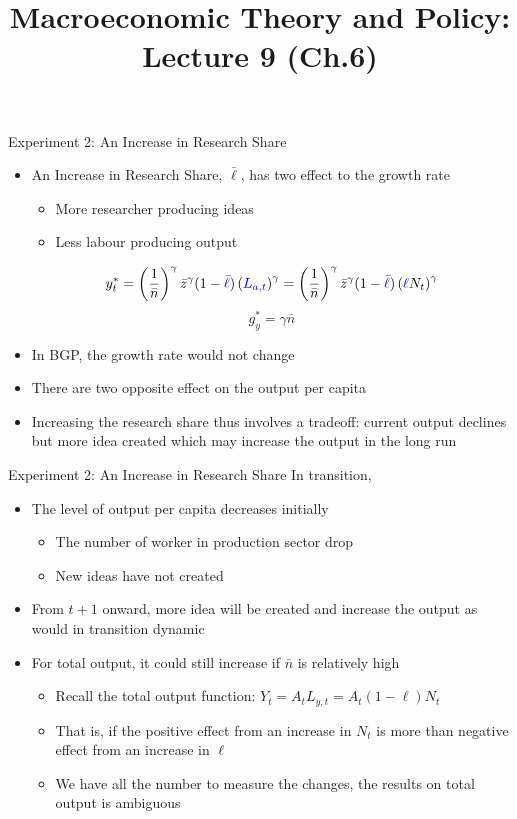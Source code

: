 \documentclass[aspectratio=1610]{beamer}
\title[Fall - Lecture 9] %
{Macroeconomic Theory and Policy: Lecture  9 (Ch.6)}
\author[University of Toronto] %
{}
\date[] %
\begin{document}
\begin{frame}
  \titlepage
\end{frame}

\begin{frame}[wide]{Experiment 2: An Increase in Research Share }
	\begin{itemize}
		\item An Increase in Research Share, $\bar{\ell}$, has two effect to the growth rate
		\begin{itemize}
			\item More researcher producing ideas
			\item Less labour producing output
		\end{itemize}
		\[y_t^* = \left(\frac{1}{\bar{n}}\right)^\gamma \bar{z}^\gamma  (1-\textcolor{blue}{\bar{\ell}}) \left( \textcolor{blue}{L_{a,t}}\right)^\gamma = \left(\frac{1}{\bar{n}}\right)^\gamma \bar{z}^\gamma  (1-\textcolor{blue}{\bar{\ell}}) \left(  \textcolor{blue}{\ell} N_t \right)^\gamma \]
		\[	g_y^* = \gamma \bar{n} \]
		\item In BGP, the growth rate would not change
		\item There are two opposite effect on the output per capita
		\item Increasing the research share thus involves a tradeoff: current output declines but more idea created which may increase the output in the long run
	\end{itemize}
\end{frame}

\begin{frame}[wide]{Experiment 2: An Increase in Research Share }
	In transition, 
	\begin{itemize}
		\item The level of output per capita decreases initially
		\begin{itemize}
			\item The number of worker in production sector drop
			\item New ideas have not created
		\end{itemize}
		\item From $t+1$ onward, more idea will be created and increase the output as would in transition dynamic
		\item For total output, it could still increase if $\bar{n}$ is relatively high 
		\begin{itemize}
			\item Recall the total output function: $Y_t=A_tL_{y,t} = A_t (1-\ell) N_t$
			\item That is, if the positive effect from an increase in $N_t$ is more than negative effect from an increase in $\ell$
			\item We have all the number to measure the changes, the results on total output is ambiguous
		\end{itemize}
	\end{itemize}
\end{frame}
\end{document}

